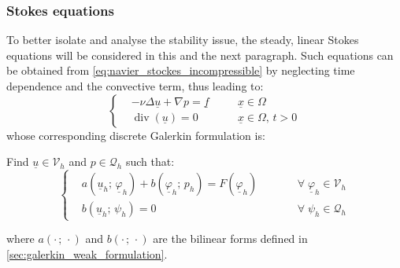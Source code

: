 \documentclass[11pt,a4paper]{article}
\renewcommand{\vec}[1]{\underline{#1}} %
\let\oldforall\forall
\renewcommand{\forall}{\oldforall \; }
\DeclareMathOperator{\Div}{div}
\begin{document}
\subsubsection{Stokes equations}
\label{subsubsec:stokes_equations}
To better isolate and analyse the stability issue, the steady, linear Stokes equations will be considered in this and the next paragraph. Such equations can be obtained from \eqref{eq:navier_stockes_incompressible} by neglecting time dependence and the convective term, thus leading to: 
\begin{equation}
    \label{eq:stokes_equations}
    \left\{
    \begin{aligned}
        & - \nu \Delta \vec{u} + \nabla p = \vec{f} \quad && \vec{x} \in \Omega\\
        &\Div(\vec{u}) = 0 && \vec{x} \in \Omega, \, t > 0
    \end{aligned}
    \right.
\end{equation}
whose corresponding discrete Galerkin formulation is:
\begin{tcolorbox}[colback = black!3, colframe=black!40]
    Find $\vec{u} \in \mathcal{V}_{h}$ and $p \in \mathcal{Q}_{h}$ such that: 
    \begin{equation}
        \label{eq:stokes_galerkin_formulation}
        \left\{ \begin{aligned}
                            &a\left(\vec{u}_{h}; \, \vec{\varphi}_{h} \right) +  b\left(\vec{\varphi}_{h}; \, p_{h} \right) = F\left( \vec{\varphi}_{h} \right) \qquad &&\forall \vec{\varphi}_{h} \in \mathcal{V}_{h} \\
                            &b \left(\vec{u}_{h}; \, \psi_{h} \right) = 0  &&\forall \psi_{h} \in \mathcal{Q}_{h}
                \end{aligned} \right.
    \end{equation}
\end{tcolorbox}
where $a(\cdot \, ; \, \cdot)$ and $b(\cdot \, ; \, \cdot)$ are the bilinear forms defined in \ref{sec:galerkin_weak_formulation}.
\end{document}
